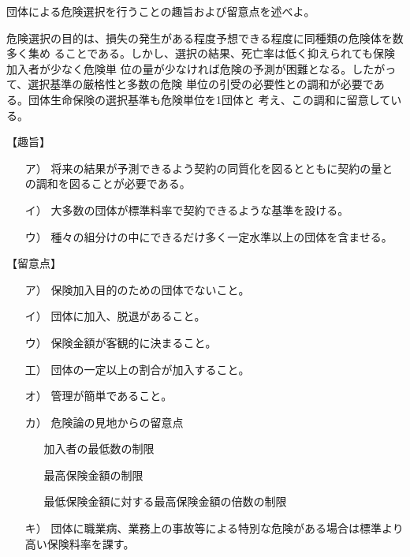 \documentclass[report,gutter=10mm,fore-edge=10mm,uplatex,dvipdfmx]{jlreq}
\begin{document}
団体による危険選択を行うことの趣旨および留意点を述べよ。
\answer{}

危険選択の目的は、損失の発生がある程度予想できる程度に同種類の危険体を数多く集め
ることである。しかし、選択の結果、死亡率は低く抑えられても保険加入者が少なく危険単
位の量が少なければ危険の予測が困難となる。したがって、選択基準の厳格性と多数の危険
単位の引受の必要性との調和が必要である。団体生命保険の選択基準も危険単位を1団体と
考え、この調和に留意している。

【趣旨】

\begin{itemize}
\item[ ア）] 将来の結果が予測できるよう契約の同質化を図るとともに契約の量との調和を図ることが必要である。
\item[ イ）] 大多数の団体が標準料率で契約できるような基準を設ける。
\item[ ウ）] 種々の組分けの中にできるだけ多く一定水準以上の団体を含ませる。
\end{itemize}

【留意点】

\begin{itemize}
\item[ ア）] 保険加入目的のための団体でないこと。
\item[ イ）] 団体に加入、脱退があること。
\item[ ウ）] 保険金額が客観的に決まること。
\item[ 工）] 団体の一定以上の割合が加入すること。
\item[ オ）] 管理が簡単であること。
\item[ カ）] 危険論の見地からの留意点
\begin{itemize}
 \item[ ] 加入者の最低数の制限
 \item[ ] 最高保険金額の制限
 \item[ ] 最低保険金額に対する最高保険金額の倍数の制限
\end{itemize}
\item[ キ）] 団体に職業病、業務上の事故等による特別な危険がある場合は標準より高い保険料率を課す。
\end{itemize}

\end{document}

